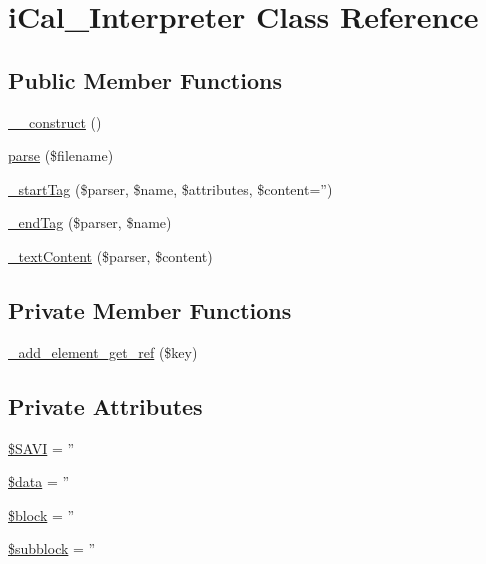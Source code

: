 \hypertarget{classiCal__Interpreter}{
\section{iCal\_\-Interpreter Class Reference}
\label{classiCal__Interpreter}
}
\subsection*{Public Member Functions}
\begin{DoxyCompactItemize}
\item 
\hyperlink{classiCal__Interpreter_a095c5d389db211932136b53f25f39685}{\_\-\_\-construct} ()
\item 
\hyperlink{classiCal__Interpreter_aec9a6d35c77c3e6b8b688d1c03fde5ee}{parse} (\$filename)
\item 
\hyperlink{classiCal__Interpreter_aeb229297a3a1b82e87e53dd9487e5bff}{\_\-startTag} (\$parser, \$name, \$attributes, \$content='')
\item 
\hyperlink{classiCal__Interpreter_a56c498ed4c6050556ce0b543293b0893}{\_\-endTag} (\$parser, \$name)
\item 
\hyperlink{classiCal__Interpreter_ac0560d6481f66765ea05016e58c36536}{\_\-textContent} (\$parser, \$content)
\end{DoxyCompactItemize}
\subsection*{Private Member Functions}
\begin{DoxyCompactItemize}
\item 
\hyperlink{classiCal__Interpreter_a31f9ef9369186dce8b0978f587d37998}{\_\-add\_\-element\_\-get\_\-ref} (\$key)
\end{DoxyCompactItemize}
\subsection*{Private Attributes}
\begin{DoxyCompactItemize}
\item 
\hyperlink{classiCal__Interpreter_a6b1385559f5a7063aaf24688452c5d55}{\$SAVI} = ''
\item 
\hyperlink{classiCal__Interpreter_a6efc15b5a2314dd4b5aaa556a375c6d6}{\$data} = ''
\item 
\hyperlink{classiCal__Interpreter_a7f8f86b37cd48a37bf0df573d8512d11}{\$block} = ''
\item 
\hyperlink{classiCal__Interpreter_a2d499c39518df37e2759becba8383526}{\$subblock} = ''
\end{DoxyCompactItemize}


